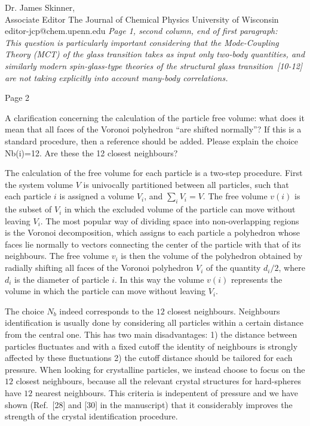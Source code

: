\documentclass[a4paper, rebuttal, parskip=true, firsthead=false, fromemail=false, foldmarks=false]{scrlttr2}
\begin{document}
\begin{letter}{Dr. James Skinner,\\Associate Editor
The Journal of Chemical Physics
University of Wisconsin\\
editor-jcp@chem.upenn.edu }
{\it Page 1, second column, end of first paragraph:\\
This question is particularly important considering that the Mode-Coupling Theory (MCT) of the glass transition takes as input only two-body quantities, and
similarly modern spin-glass-type theories of the structural glass transition~[10-12] are not taking explicitly into account many-body correlations.
}


\begin{quotationi}
Page 2

A clarification concerning the calculation of the particle free volume: what does it mean that all faces of the Voronoi polyhedron ``are shifted normally''? If this is a standard procedure, then a reference should be added.
Please explain the choice Nb(i)=12. Are these the 12 closest neighbours?
\end{quotationi}

The calculation of the free volume for each particle is a two-step procedure. First the system volume $V$ is univocally partitioned between all particles,
such that each particle $i$ is assigned a volume $V_i$, and $\sum_i V_i=V$. The free volume $v(i)$ is the subset of $V_i$ in which the excluded volume of
the particle can move without leaving $V_i$. The most popular way of dividing space into non-overlapping regions is the Voronoi decomposition, which assigns to each
particle a polyhedron whose faces lie normally to vectors connecting the center of the particle with that of its neighbours. The free volume $v_i$ is
then the volume of the polyhedron obtained by radially shifting all faces of the Voronoi polyhedron $V_i$ of the quantity $d_i/2$, where $d_i$ is the diameter of particle $i$. In this way the volume $v(i)$ represents the volume in which the particle can move without leaving $V_i$.

The choice $N_b$ indeed corresponds to the $12$ closest neighbours. Neighbours identification is usually done by considering all particles within
a certain distance from the central one. This has two main disadvantages: 1) the distance between particles fluctuates and with a fixed cutoff the
identity of neighbours is strongly affected by these fluctuations 2) the cutoff distance should be tailored for each pressure.
When looking for crystalline particles, we instead choose to focus on the $12$ closest neighbours, because all the relevant crystal structures for
hard-spheres have $12$ nearest neighbours. This criteria is indepentent of pressure and we have shown (Ref.~[28] and [30] in the manuscript) that it considerably
improves the strength of the crystal identification procedure.


\end{letter}
\end{document}
